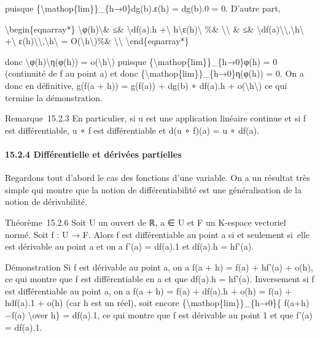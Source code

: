 \documentclass[]{article}
\begin{document}
puisque \{\textbackslash{}mathop\{lim\}\}\_\{h→0\}dg(b).ε(h) = dg(b).0 =
0. D'autre part,

\textbackslash{}begin\{eqnarray*\}
\textbackslash{}\textbar{}φ(h)\textbackslash{}\textbar{}\& ≤\&
\textbackslash{}\textbar{}df(a).h +\textbackslash{}\textbar{}
h\textbackslash{}\textbar{}ε(h)\textbackslash{}\textbar{} \%\&
\textbackslash{}\textbackslash{} \& ≤\&
\textbackslash{}\textbar{}df(a)\textbackslash{}\textbar{}\textbackslash{},\textbackslash{}\textbar{}h\textbackslash{}\textbar{}
+\textbackslash{}\textbar{}
ε(h)\textbackslash{}\textbar{}\textbackslash{},\textbackslash{}\textbar{}h\textbackslash{}\textbar{}
= O(\textbackslash{}\textbar{}h\textbackslash{}\textbar{})\%\&
\textbackslash{}\textbackslash{} \textbackslash{}end\{eqnarray*\}

donc \textbackslash{}\textbar{}φ(h)\textbackslash{}\textbar{}η(φ(h)) =
o(\textbackslash{}\textbar{}h\textbackslash{}\textbar{}) puisque
\{\textbackslash{}mathop\{lim\}\}\_\{h→0\}φ(h) = 0 (continuité de f au
point a) et donc \{\textbackslash{}mathop\{lim\}\}\_\{h→0\}η(φ(h)) = 0.
On a donc en définitive, g(f(a + h)) = g(f(a)) + dg(b) ∘ df(a).h +
o(\textbackslash{}\textbar{}h\textbackslash{}\textbar{}) ce qui termine
la démonstration.

Remarque~15.2.3 En particulier, si u est une application linéaire
continue et si f est différentiable, u ∘ f est différentiable et d(u ∘
f)(a) = u ∘ df(a).

\paragraph{15.2.4 Différentielle et dérivées partielles}

Regardons tout d'abord le cas des fonctions d'une variable. On a un
résultat très simple qui montre que la notion de différentiabilité est
une généralisation de la notion de dérivabilité.

Théorème~15.2.6 Soit U un ouvert de ℝ, a ∈ U et F un K-espace vectoriel
normé. Soit f : U → F. Alors f est différentiable au point a si et
seulement si~elle est dérivable au point a et on a f'(a) = df(a).1 et
df(a).h = hf'(a).

Démonstration Si f est dérivable au point a, on a f(a + h) = f(a) +
hf'(a) + o(h), ce qui montre que f est différentiable en a et que
df(a).h = hf'(a). Inversement si f est différentiable au point a, on a
f(a + h) = f(a) + df(a).h + o(h) = f(a) + hdf(a).1 + o(h) (car h est un
réel), soit encore \{\textbackslash{}mathop\{lim\}\}\_\{h→0\}\{
f(a+h)−f(a) \textbackslash{}over h\} = df(a).1, ce qui montre que f est
dérivable au point 1 et que f'(a) = df(a).1.
\end{document}
